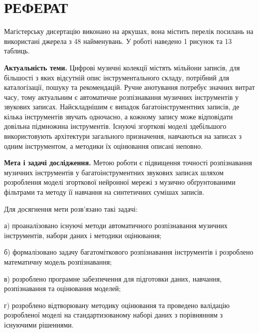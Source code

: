 \renewcommand{\abstractUkr}{\chapter*{РЕФЕРАТ}\thispagestyle{empty}\renewcommand{\arraystretch}{1.5}\setfontsize{14}}
\renewcommand{\abstractEng}{\chapter*{ABSTRACT}\thispagestyle{empty}\renewcommand{\arraystretch}{1.5}}


\abstractUkr

Магістерську дисертацію виконано на \pageref{LastPage} аркушах, вона містить перелік посилань на використані джерела з 48 найменувань. У роботі наведено 1 рисунок та 13 таблиць.

\textbf{Актуальність теми.}
Цифрові музичні колекції містять мільйони записів, для більшості з яких
відсутній опис інструментального складу, потрібний для каталогізації,
пошуку та рекомендацій. Ручне анотування потребує значних витрат часу,
тому актуальним є автоматичне розпізнавання музичних інструментів у
звукових записах. Найскладнішим є випадок багатоінструментних записів,
де кілька інструментів звучать одночасно, а кожному запису може
відповідати довільна підмножина інструментів. Існуючі згорткові моделі
здебільшого використовують архітектури загального призначення,
навчаються на записах з одним інструментом, а методики їх оцінювання
описані неповно.

\textbf{Мета і задачі дослідження.}
Метою роботи є підвищення точності розпізнавання музичних інструментів
у багатоінструментних звукових записах шляхом розроблення моделі
згорткової нейронної мережі з музично обґрунтованими фільтрами та методу
її навчання на синтетичних сумішах записів.

Для досягнення мети розв'язано такі задачі:

а) проаналізовано існуючі методи автоматичного розпізнавання музичних
інструментів, набори даних і методики оцінювання;

б) формалізовано задачу багатоміткового розпізнавання інструментів і
розроблено математичну модель розпізнавання;

в) розроблено програмне забезпечення для підготовки даних, навчання,
розпізнавання та оцінювання моделей;

г) розроблено відтворювану методику оцінювання та проведено валідацію
розробленої моделі на стандартизованому наборі даних з порівнянням з
існуючими рішеннями.

